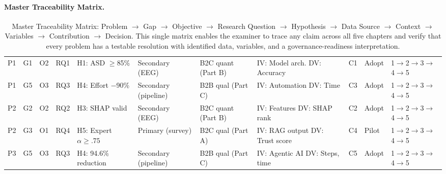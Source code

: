 {%
\tablefontsize
\paragraph{Master Traceability Matrix.}



\begin{xltabular}{\textwidth}{@{} >{\raggedright\arraybackslash}p{0.9cm} >{\raggedright\arraybackslash}p{1.1cm} >{\raggedright\arraybackslash}p{0.5cm} >{\raggedright\arraybackslash}p{0.5cm} >{\raggedright\arraybackslash}p{1.6cm} >{\raggedright\arraybackslash}p{0.8cm} >{\raggedright\arraybackslash}p{0.8cm} >{\raggedright\arraybackslash}p{1.4cm} >{\raggedright\arraybackslash}p{1.0cm} >{\raggedright\arraybackslash}p{1.0cm} L @{}}
\caption[Master Traceability Matrix]{Master Traceability Matrix: Problem $\to$ Gap $\to$ Objective $\to$ Research Question $\to$ Hypothesis $\to$ Data Source $\to$ Context $\to$ Variables $\to$ Contribution $\to$ Decision. This single matrix enables the examiner to trace any claim across all five chapters and verify that every problem has a testable resolution with identified data, variables, and a governance-readiness interpretation.}
\label{tab:research_flow_alignment} \\
\toprule
{} &  &  &  &  &  &  &  &  &  &  \\
\midrule
\endfirsthead
\endhead
\bottomrule
\endlastfoot
P1 & G1 & O2 & RQ1 & H1: ASD $\geq$85\% & Secondary (EEG) & B2C quant (Part B) & IV: Model arch. DV: Accuracy & C1 & Adopt & 1$\to$2$\to$3$\to$4$\to$5 \\
\addlinespace
P1 & G5 & O3 & RQ3 & H4: Effort $-$90\% & Secondary (pipeline) & B2B qual (Part C) & IV: Automation DV: Time & C3 & Adopt & 1$\to$2$\to$3$\to$4$\to$5 \\
\addlinespace
P2 & G2 & O2 & RQ2 & H3: SHAP valid & Secondary (EEG) & B2C quant (Part B) & IV: Features DV: SHAP rank & C2 & Adopt & 1$\to$2$\to$3$\to$4$\to$5 \\
\addlinespace
P2 & G3 & O1 & RQ4 & H5: Expert $\alpha \geq .75$ & Primary (survey) & B2C qual (Part A) & IV: RAG output DV: Trust score & C4 & Pilot & 1$\to$2$\to$3$\to$4$\to$5 \\
\addlinespace
P3 & G5 & O3 & RQ3 & H4: 94.6\% reduction & Secondary (pipeline) & B2B qual (Part C) & IV: Agentic AI DV: Steps, time & C5 & Adopt & 1$\to$2$\to$3$\to$4$\to$5 \\

\end{xltabular}}
